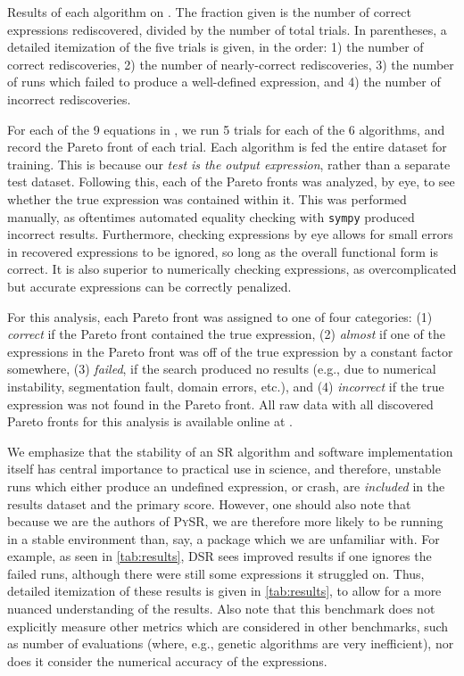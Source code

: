 \documentclass[letterpaper,twocolumn]{scrartcl}
\newcommand\pysr{\textsc{PySR}\xspace}
\begin{document}
\begin{table*}[h!]
    \centering
    \caption{Results of each algorithm on \bench.
    The fraction given is the number of correct expressions rediscovered, divided by the number of total trials.
    In parentheses, a detailed itemization of the five trials is given, in the order: 1) the number of correct rediscoveries, 2) the number of nearly-correct rediscoveries, 3) the number of runs which failed to produce a well-defined expression, and 4) the number of incorrect rediscoveries.
    }
    \label{tab:results}
\end{table*}

For each of the 9 equations in \bench, we run 5 trials for each of the 6 algorithms, and record the Pareto front of each trial.
Each algorithm is fed the entire dataset for training.
This is because our \textit{test is the output expression}, rather than a separate test dataset.
Following this, each of the Pareto fronts was analyzed, by eye, to see whether the true expression was contained within it.
This was performed manually, as oftentimes automated equality checking with \texttt{sympy} produced incorrect results.
Furthermore, checking expressions by eye allows for small errors in recovered expressions to be ignored, so long as the overall functional form is correct.
It is also superior to numerically checking expressions, as overcomplicated but accurate expressions can be correctly penalized.

For this analysis, each Pareto front was assigned to one of four categories: (1) \textit{correct} if the Pareto front contained the true expression, (2) \textit{almost} if one of the expressions in the Pareto front was off of the true expression by a constant factor somewhere, (3) \textit{failed}, if the search produced no results (e.g., due to numerical instability, segmentation fault, domain errors, etc.), and (4) \textit{incorrect} if the true expression was not found in the Pareto front.
All raw data with all discovered Pareto fronts for this analysis is available online at .



We emphasize that the stability of an SR algorithm and software implementation itself has central importance to practical use in science, and therefore, unstable runs which either produce an undefined expression, or crash, are \textit{included} in the results dataset and the primary score.
However, one should also note that because we are the authors of \pysr, we are therefore more likely to be running in a stable environment than, say, a package which we are unfamiliar with.
For example, as seen in \cref{tab:results}, DSR sees improved results if one ignores the failed runs, although there were still some expressions it struggled on.
Thus, detailed itemization of these results is given in \cref{tab:results}, to allow for a more nuanced understanding of the results.
Also note that this benchmark does not explicitly measure other metrics which are considered in other benchmarks, such as number of evaluations (where, e.g., genetic algorithms are very inefficient), nor does it consider the numerical accuracy of the expressions.
\end{document}

